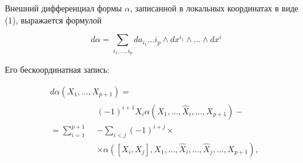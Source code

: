 \documentclass[10pt]{article}
\begin{document}
Внешний дифференциал формы $\alpha$, записанной в локальных координатах в виде (1), выражается формулой



\[

d \alpha=\sum_{i_{1}, \ldots, i_{p}} d a_{i_{1}} \ldots i_{p} \wedge d x^{i_{1}} \wedge \ldots \wedge d x^{i}{ }

\]



Его бескоординатная запись:



\[

\begin{gathered}

d \alpha\left(X_{1}, \ldots, X_{p+1}\right)= \\

=\sum_{i=1}^{p+1} \begin{aligned}

&(-1)^{i+1} X_{i} \alpha\left(X_{1}, \ldots, \hat{X}_{i}, \ldots, X_{p+1}\right)- \\

&-\sum_{i<j}(-1)^{i+j} \times \\

& \times \alpha\left(\left[X_{i}, X_{j}\right],\right.\left.X_{1}, \ldots, \hat{X}_{i}, \ldots, \hat{X}_{j}, \ldots, X_{p+1}\right),

\end{aligned}

\end{gathered}

\]
\end{document}
